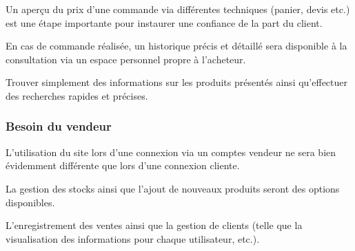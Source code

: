 \documentclass[a4paper]{article}
\begin{document}
	Un aperçu du prix d'une commande via différentes techniques (panier, devis etc.) est une étape importante pour instaurer une confiance de la part du client.
	
	En cas de commande réalisée, un historique précis et détaillé sera disponible à la consultation via un espace personnel propre à l'acheteur.
	
	Trouver simplement des informations sur les produits présentés ainsi qu'effectuer des recherches rapides et précises. 
		\subsubsection{Besoin du vendeur}
		L'utilisation du site lors d'une connexion via un comptes vendeur ne sera bien évidemment différente que lors d'une connexion cliente.
		
		La gestion des stocks ainsi que l'ajout de nouveaux produits seront des options disponibles.
		
		L'enregistrement des ventes ainsi que la gestion de clients (telle que la visualisation des informations pour chaque utilisateur, etc.).
\end{document}
